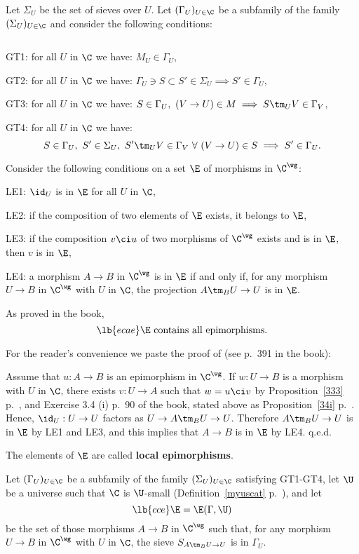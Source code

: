 \documentclass[12pt]{article}
\theoremstyle{remark}
\theoremstyle{definition}
\begin{document}
Let $\Sigma_U$ be the set of sieves over $U$. Let $(\Gamma_U)_{U\in\C}$ be a subfamily of the family $(\Sigma_U)_{U\in\C}$ and consider the following conditions:

\begin{cond}
$\ $

\nn GT1: for all $U$ in $\C$ we have: $M_U\in\Gamma_U$,

\nn GT2: for all $U$ in $\C$ we have: $\Gamma_U\ni S\subset S'\in\Sigma_U\implies S'\in\Gamma_U$,

\nn GT3: for all $U$ in $\C$ we have: $S\in\Gamma_U,\ (V\to U)\in M\implies S\tm_UV\in\Gamma_V$,

\nn GT4: for all $U$ in $\C$ we have: 
$$
S\in\Gamma_U,\ S'\in\Sigma_U,\ S'\tm_UV\in\Gamma_V\ \forall\ (V\to U)\in S\implies S'\in\Gamma_U.
$$
\end{cond}

Consider the following conditions on a set $\E$ of morphisms in $\C^\wg$:

\nn LE1: $\id_U$ is in $\E$ for all $U$ in $\C$,

\nn LE2: if the composition of two elements of $\E$ exists, it belongs to $\E$,

\nn LE3: if the composition $v\ci u$ of two morphisms of $\C^\wg$ exists and is in $\E$, then $v$ is in $\E$,

\nn LE4: a morphism $A\to B$ in $\C^\wg$ is in $\E$ if and only if, for any morphism $U\to B$ in $\C^\wg$ with $U$ in $\C$, the projection $A\tm_BU\to U$ is in $\E$.

As proved in the book, 
\begin{equation}\lb{ecae}
\E\text{ contains all epimorphisms.}
\end{equation}

For the reader's convenience we paste the proof of  (see p.~391 in the book):

Assume that $u:A\to B$ is an epimorphism in $\C^\wg$. If $w:U\to B$ is a morphism with $U$ in $\C$, there exists $v:U\to A$ such that $w=u\ci v$ by Proposition~\ref{333} p.~, and Exercise 3.4 (i) p.~90 of the book, stated above as Proposition~\ref{34i} p.~. Hence, $\id_U:U\to U$ factors as $U\to A\tm_BU\to U$. Therefore $A\tm_BU\to U$ is in $\E$ by LE1 and LE3, and this implies that $A\to B$ is in $\E$ by LE4. q.e.d.

The elements of $\E$ are called \textbf{local epimorphisms}.

Let $(\Gamma_U)_{U\in\C}$ be a subfamily of the family $(\Sigma_U)_{U\in\C}$ satisfying GT1\--GT4, let $\U$ be a universe such that $\C$ is $\U$-small (Definition~\ref{myuscat} p.~), and let 
\begin{equation}\lb{cce}
\E=\E(\Gamma,\U)
\end{equation} 
be the set of those morphisms $A\to B$ in $\C^\wg$ such that, for any morphism $U\to B$ in $\C^\wg$ with $U$ in $\C$, the sieve $S_{A\tm_BU\to U}$ is in $\Gamma_U$. 
\end{document}
